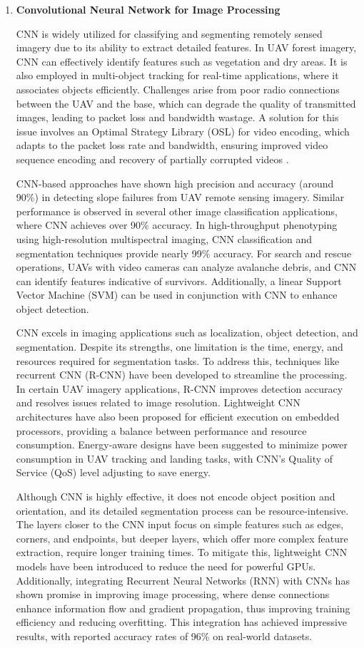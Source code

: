 \begin{enumerate}
    
    \item \textbf{Convolutional Neural Network for Image Processing}

    CNN is widely utilized for classifying and segmenting remotely sensed imagery due to its ability to extract detailed features. In UAV forest imagery, CNN can effectively identify features such as vegetation and dry areas. It is also employed in multi-object tracking for real-time applications, where it associates objects efficiently. Challenges arise from poor radio connections between the UAV and the base, which can degrade the quality of transmitted images, leading to packet loss and bandwidth wastage. A solution for this issue involves an Optimal Strategy Library (OSL) for video encoding, which adapts to the packet loss rate and bandwidth, ensuring improved video sequence encoding and recovery of partially corrupted videos \cite{kurunathan2022machine}.
    
    CNN-based approaches have shown high precision and accuracy (around 90\%) in detecting slope failures from UAV remote sensing imagery. Similar performance is observed in several other image classification applications, where CNN achieves over 90\% accuracy. In high-throughput phenotyping using high-resolution multispectral imaging, CNN classification and segmentation techniques provide nearly 99\% accuracy. For search and rescue operations, UAVs with video cameras can analyze avalanche debris, and CNN can identify features indicative of survivors. Additionally, a linear Support Vector Machine (SVM) can be used in conjunction with CNN to enhance object detection.
    
    CNN excels in imaging applications such as localization, object detection, and segmentation. Despite its strengths, one limitation is the time, energy, and resources required for segmentation tasks. To address this, techniques like recurrent CNN (R-CNN) have been developed to streamline the processing. In certain UAV imagery applications, R-CNN improves detection accuracy and resolves issues related to image resolution. Lightweight CNN architectures have also been proposed for efficient execution on embedded processors, providing a balance between performance and resource consumption. Energy-aware designs have been suggested to minimize power consumption in UAV tracking and landing tasks, with CNN's Quality of Service (QoS) level adjusting to save energy.
    
    Although CNN is highly effective, it does not encode object position and orientation, and its detailed segmentation process can be resource-intensive. The layers closer to the CNN input focus on simple features such as edges, corners, and endpoints, but deeper layers, which offer more complex feature extraction, require longer training times. To mitigate this, lightweight CNN models have been introduced to reduce the need for powerful GPUs. Additionally, integrating Recurrent Neural Networks (RNN) with CNNs has shown promise in improving image processing, where dense connections enhance information flow and gradient propagation, thus improving training efficiency and reducing overfitting. This integration has achieved impressive results, with reported accuracy rates of 96\% on real-world datasets.
    


\end{enumerate}
